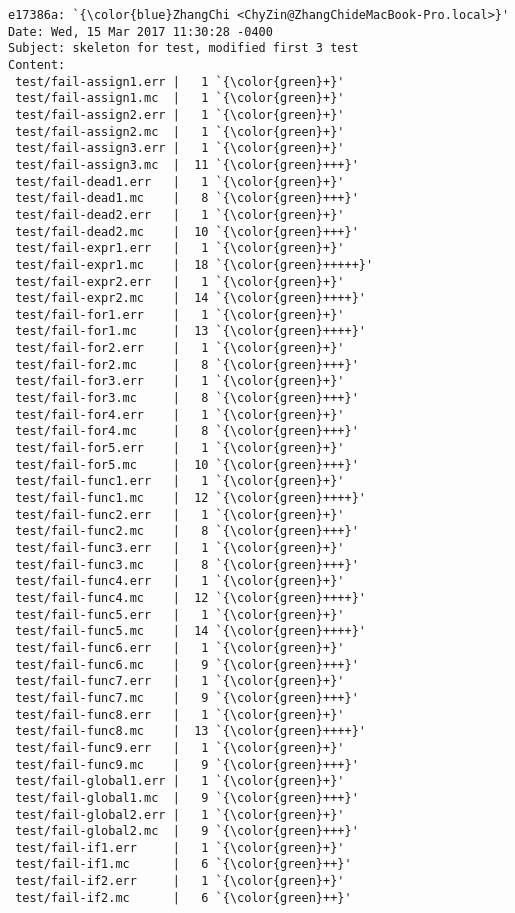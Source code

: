 \begin{lstlisting}
e17386a: `{\color{blue}ZhangChi <ChyZin@ZhangChideMacBook-Pro.local>}'
Date: Wed, 15 Mar 2017 11:30:28 -0400
Subject: skeleton for test, modified first 3 test
Content: 
 test/fail-assign1.err |   1 `{\color{green}+}'
 test/fail-assign1.mc  |   1 `{\color{green}+}'
 test/fail-assign2.err |   1 `{\color{green}+}'
 test/fail-assign2.mc  |   1 `{\color{green}+}'
 test/fail-assign3.err |   1 `{\color{green}+}'
 test/fail-assign3.mc  |  11 `{\color{green}+++}'
 test/fail-dead1.err   |   1 `{\color{green}+}'
 test/fail-dead1.mc    |   8 `{\color{green}+++}'
 test/fail-dead2.err   |   1 `{\color{green}+}'
 test/fail-dead2.mc    |  10 `{\color{green}+++}'
 test/fail-expr1.err   |   1 `{\color{green}+}'
 test/fail-expr1.mc    |  18 `{\color{green}+++++}'
 test/fail-expr2.err   |   1 `{\color{green}+}'
 test/fail-expr2.mc    |  14 `{\color{green}++++}'
 test/fail-for1.err    |   1 `{\color{green}+}'
 test/fail-for1.mc     |  13 `{\color{green}++++}'
 test/fail-for2.err    |   1 `{\color{green}+}'
 test/fail-for2.mc     |   8 `{\color{green}+++}'
 test/fail-for3.err    |   1 `{\color{green}+}'
 test/fail-for3.mc     |   8 `{\color{green}+++}'
 test/fail-for4.err    |   1 `{\color{green}+}'
 test/fail-for4.mc     |   8 `{\color{green}+++}'
 test/fail-for5.err    |   1 `{\color{green}+}'
 test/fail-for5.mc     |  10 `{\color{green}+++}'
 test/fail-func1.err   |   1 `{\color{green}+}'
 test/fail-func1.mc    |  12 `{\color{green}++++}'
 test/fail-func2.err   |   1 `{\color{green}+}'
 test/fail-func2.mc    |   8 `{\color{green}+++}'
 test/fail-func3.err   |   1 `{\color{green}+}'
 test/fail-func3.mc    |   8 `{\color{green}+++}'
 test/fail-func4.err   |   1 `{\color{green}+}'
 test/fail-func4.mc    |  12 `{\color{green}++++}'
 test/fail-func5.err   |   1 `{\color{green}+}'
 test/fail-func5.mc    |  14 `{\color{green}++++}'
 test/fail-func6.err   |   1 `{\color{green}+}'
 test/fail-func6.mc    |   9 `{\color{green}+++}'
 test/fail-func7.err   |   1 `{\color{green}+}'
 test/fail-func7.mc    |   9 `{\color{green}+++}'
 test/fail-func8.err   |   1 `{\color{green}+}'
 test/fail-func8.mc    |  13 `{\color{green}++++}'
 test/fail-func9.err   |   1 `{\color{green}+}'
 test/fail-func9.mc    |   9 `{\color{green}+++}'
 test/fail-global1.err |   1 `{\color{green}+}'
 test/fail-global1.mc  |   9 `{\color{green}+++}'
 test/fail-global2.err |   1 `{\color{green}+}'
 test/fail-global2.mc  |   9 `{\color{green}+++}'
 test/fail-if1.err     |   1 `{\color{green}+}'
 test/fail-if1.mc      |   6 `{\color{green}++}'
 test/fail-if2.err     |   1 `{\color{green}+}'
 test/fail-if2.mc      |   6 `{\color{green}++}'

\end{lstlisting}

